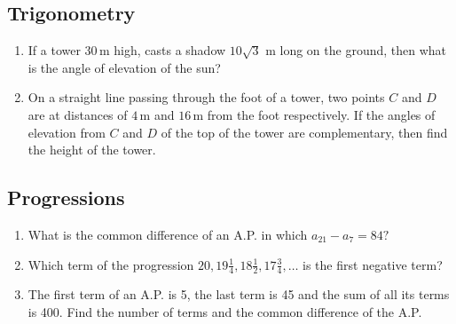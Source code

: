 \documentclass[12pt,-letter paper]{article}
\begin{document}
\begin{center}
\section*{Trigonometry}
\end{center}
\begin{enumerate}
\item If a tower $30\,\mathrm{m}$ high, casts a shadow $10\sqrt{3}$
m long on the ground, then what is the angle of elevation of the sun?
\item On a straight line passing through the foot of a tower, two points $C$ and $D$ are at distances of $4\,\mathrm{m}$ and $16\,\mathrm{m}$ from the foot respectively. If the angles of elevation from $C$ and $D$ of the top of the tower are complementary, then find the height of the tower.
\end{enumerate}
\begin{center}
	\section*{Progressions}
\end{center}
\begin{enumerate}
	\item What is the common difference of an A.P. in which $ a_{21} - a_{7} = 84?$
\item Which term of the progression $20,19\frac{1}{4}, 18\frac{1}{2}, 17\frac{3}{4},\ldots$ is the first negative term?
\item The first term of an A.P. is 5, the last term is 45 and the sum of all its 
terms is 400. Find the number of terms and the common difference of the A.P.
\end{enumerate}
\end{document}
